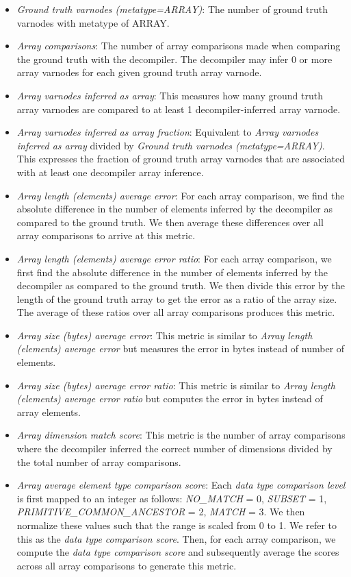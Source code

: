 \begin{itemize}
    \item \emph{Ground truth varnodes (metatype=ARRAY)}: The number of ground truth varnodes with metatype of ARRAY.
    \item \emph{Array comparisons}: The number of array comparisons made when comparing the ground truth with the decompiler. The decompiler may infer 0 or more array varnodes for each given ground truth array varnode.
    \item \emph{Array varnodes inferred as array}: This measures how many ground truth array varnodes are compared to at least 1 decompiler-inferred array varnode.
    \item \emph{Array varnodes inferred as array fraction}: Equivalent to \emph{Array varnodes inferred as array} divided by \emph{Ground truth varnodes (metatype=ARRAY)}. This expresses the fraction of ground truth array varnodes that are associated with at least one decompiler array inference.
    \item \emph{Array length (elements) average error}: For each array comparison, we find the absolute difference in the number of elements inferred by the decompiler as compared to the ground truth. We then average these differences over all array comparisons to arrive at this metric.
    \item \emph{Array length (elements) average error ratio}: For each array comparison, we first find the absolute difference in the number of elements inferred by the decompiler as compared to the ground truth. We then divide this error by the length of the ground truth array to get the error as a ratio of the array size. The average of these ratios over all array comparisons produces this metric.
    \item \emph{Array size (bytes) average error}: This metric is similar to \emph{Array length (elements) average error} but measures the error in bytes instead of number of elements.
    \item \emph{Array size (bytes) average error ratio}: This metric is similar to \emph{Array length (elements) average error ratio} but computes the error in bytes instead of array elements.
    \item \emph{Array dimension match score}: This metric is the number of array comparisons where the decompiler inferred the correct number of dimensions divided by the total number of array comparisons.
    \item \emph{Array average element type comparison score}: Each \emph{data type comparison level} is first mapped to an integer as follows: \emph{NO\_MATCH} = 0, \emph{SUBSET} = 1, \emph{PRIMITIVE\_COMMON\_ANCESTOR} = 2, \emph{MATCH} = 3. We then normalize these values such that the range is scaled from 0 to 1. We refer to this as the \emph{data type comparison score}. Then, for each array comparison, we compute the \emph{data type comparison score} and subsequently average the scores across all array comparisons to generate this metric.
\end{itemize}


